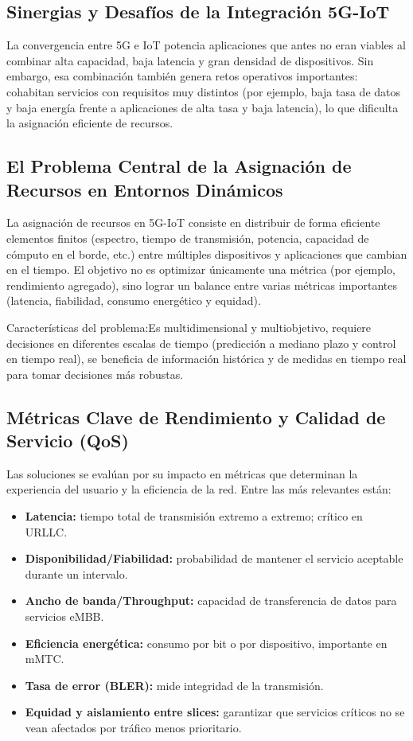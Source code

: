 \documentclass[12pt,a4paper]{article}
\begin{document}
\subsection{Sinergias y Desafíos de la Integración 5G-IoT}

La convergencia entre 5G e IoT potencia aplicaciones que antes no eran viables al combinar alta capacidad, baja latencia y gran densidad de dispositivos. Sin embargo, esa combinación también genera retos operativos importantes: cohabitan servicios con requisitos muy distintos (por ejemplo, baja tasa de datos y baja energía frente a aplicaciones de alta tasa y baja latencia), lo que dificulta la asignación eficiente de recursos.

\subsection{El Problema Central de la Asignación de Recursos en Entornos Dinámicos}

La asignación de recursos en 5G-IoT consiste en distribuir de forma eficiente elementos finitos (espectro, tiempo de transmisión, potencia, capacidad de cómputo en el borde, etc.) entre múltiples dispositivos y aplicaciones que cambian en el tiempo. El objetivo no es optimizar únicamente una métrica (por ejemplo, rendimiento agregado), sino lograr un balance entre varias métricas importantes (latencia, fiabilidad, consumo energético y equidad).

Características del problema:Es multidimensional y multiobjetivo, requiere decisiones en diferentes escalas de tiempo (predicción a mediano plazo y control en tiempo real), se beneficia de información histórica y de medidas en tiempo real para tomar decisiones más robustas.

\subsection{Métricas Clave de Rendimiento y Calidad de Servicio (QoS)}

Las soluciones se evalúan por su impacto en métricas que determinan la experiencia del usuario y la eficiencia de la red. Entre las más relevantes están:
\begin{itemize}
\item \textbf{Latencia:} tiempo total de transmisión extremo a extremo; crítico en URLLC.
\item \textbf{Disponibilidad/Fiabilidad:} probabilidad de mantener el servicio aceptable durante un intervalo.
\item \textbf{Ancho de banda/Throughput:} capacidad de transferencia de datos para servicios eMBB.
\item \textbf{Eficiencia energética:} consumo por bit o por dispositivo, importante en mMTC.
\item \textbf{Tasa de error (BLER):} mide integridad de la transmisión.
\item \textbf{Equidad y aislamiento entre slices:} garantizar que servicios críticos no se vean afectados por tráfico menos prioritario.
\end{itemize}
\end{document}
